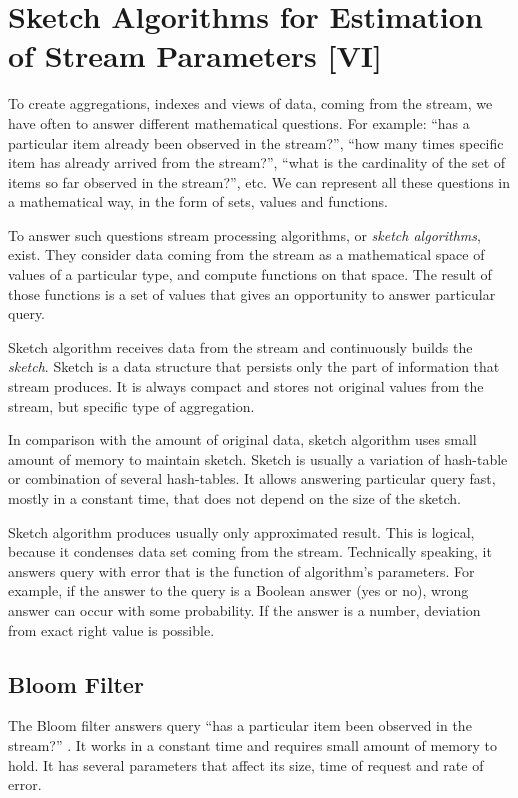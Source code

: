 \section{Sketch Algorithms for Estimation of Stream Parameters [VI]}

To create aggregations, indexes and views of data, coming from the stream, we have often to answer different mathematical questions.
For example: ``has a particular item already been observed in the stream?'', ``how many times specific item has already arrived from the stream?'', ``what is the cardinality of the set of items so far observed in the stream?'', etc.
We can represent all these questions in a mathematical way, in the form of sets, values and functions.

To answer such questions stream processing algorithms, or \textit{sketch algorithms}, exist.
They consider data coming from the stream as a mathematical space of values of a particular type, and compute functions on that space.
The result of those functions is a set of values that gives an opportunity to answer particular query.

Sketch algorithm receives data from the stream and continuously builds the \textit{sketch}.
Sketch is a data structure that persists only the part of information that stream produces.
It is always compact and stores not original values from the stream, but specific type of aggregation.

In comparison with the amount of original data, sketch algorithm uses small amount of memory to maintain sketch.
Sketch is usually a variation of hash-table or combination of several hash-tables.
It allows answering particular query fast, mostly in a constant time, that does not depend on the size of the sketch.

Sketch algorithm produces usually only approximated result.
This is logical, because it condenses data set coming from the stream.
Technically speaking, it answers query with error that is the function of algorithm's parameters.
For example, if the answer to the query is a Boolean answer (yes or no), wrong answer can occur with some probability.
If the answer is a number, deviation from exact right value is possible.

\subsection{Bloom Filter}

The Bloom filter answers query ``has a particular item been observed in the stream?'' \cite{Cormode}.
It works in a constant time and requires small amount of memory to hold.
It has several parameters that affect its size, time of request and rate of error.

